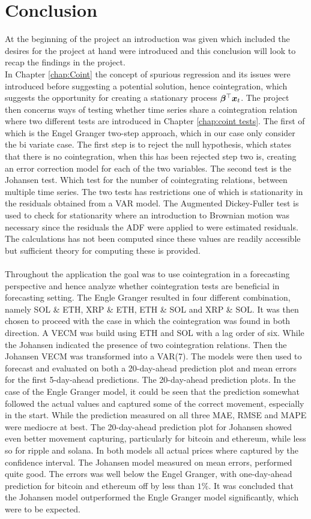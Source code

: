 \chapter{Conclusion}
At the beginning of the project an introduction was given which included the desires for the project at hand were introduced and this conclusion will look to recap the findings in the project.\\
In Chapter \ref{chap:Coint} the concept of spurious regression and its issues were introduced before suggesting a potential solution, hence cointegration, which suggests the opportunity for creating a stationary process $\boldsymbol{\beta}^\top\boldsymbol{x}_t$. The project then concerns ways of testing whether time series share a cointegration relation where two different tests are introduced in Chapter \ref{chap:coint tests}. The first of which is the Engel Granger two-step approach, which in our case only consider the bi variate case. The first step is to reject the null hypothesis, which states that there is no cointegration, when this has been rejected step two is, creating an error correction model for each of the two variables. The second test is the Johansen test. Which test for the number of cointegrating relations, between multiple time series. The two tests has restrictions one of which is stationarity in the residuals obtained from a VAR model. The Augmented Dickey-Fuller test is used to check for stationarity where an introduction to Brownian motion was necessary since the residuals the ADF were applied to were estimated residuals. The calculations has not been computed since these values are readily accessible but sufficient theory for computing these is provided. \\\\
Throughout the application the goal was to use cointegration in a forecasting perspective and hence analyze whether cointegration tests are beneficial in forecasting setting. The Engle Granger resulted in four different combination, namely SOL \& ETH, XRP \& ETH, ETH \& SOL and XRP \& SOL. It was then chosen to proceed with the case in which the cointegration was found in both direction. A VECM was build using ETH and SOL with a lag order of six. While the Johansen indicated the presence of two cointegration relations. Then the Johansen VECM was transformed into a VAR(7). The models were then used to forecast and evaluated on both a 20-day-ahead prediction plot and mean errors for the first 5-day-ahead predictions. The 20-day-ahead prediction plots. In the case of the Engle Granger model, it could be seen that the prediction somewhat followed the actual values and captured some of the correct movement, especially in the start. While the prediction measured on all three MAE, RMSE and MAPE were mediocre at best. The 20-day-ahead prediction plot for Johansen showed even better movement capturing, particularly for bitcoin and ethereum, while less so for ripple and solana. In both models all actual prices where captured by the confidence interval. The Johansen model measured on mean errors, performed quite good. The errors was well below the Engel Granger, with one-day-ahead prediction for bitcoin and ethereum off by less than $1\%$. It was concluded that the Johansen model outperformed the Engle Granger model significantly, which were to be expected.

